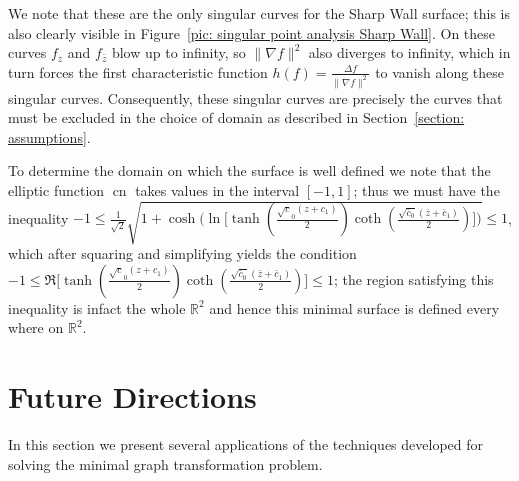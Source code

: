 \documentclass[12pt]{article}
\theoremstyle{plain}
\theoremstyle{definition}
\theoremstyle{remark}
\begin{document}
  We note that these are the only singular curves for the Sharp Wall surface; this is also clearly visible in Figure~\ref{pic: singular point analysis Sharp Wall}. On these curves \(f_z\) and \(f_{\bar z}\) blow up to infinity, so \(\|\nabla f\|^2\) also diverges to infinity, which in turn forces the first characteristic function \(h(f)=\tfrac{\Delta f}{\|\nabla f\|^2}\) to vanish along these singular curves. Consequently, these singular curves are precisely the curves that must be excluded in the choice of domain as described in Section~\ref{section: assumptions}.
  
  To determine the domain on which the surface is well defined we note that the elliptic function \(\operatorname{cn}\) takes values in the interval \([-1,1]\); thus we must have the inequality \(-1\leq\tfrac{1}{\sqrt{2}}\sqrt{1 + \cosh\!\big(\ln\!\big[\tanh(\tfrac{\sqrt c_0(z+c_1)}{2})\coth(\tfrac{\sqrt{\bar c_0}(\bar z+\bar c_1)}{2})\big]\big)}\leq 1\), which after squaring and simplifying yields the condition \(-1\leq\Re\!\big[\tanh(\tfrac{\sqrt c_0(z+c_1)}{2})\coth(\tfrac{\sqrt{\bar c_0}(\bar z+\bar c_1)}{2})\big]\leq 1\); the region satisfying this inequality is infact the whole \(\mathbb{R}^2\) and hence this minimal surface is defined every where on \(\mathbb{R}^2\).
  
  \section{Future Directions}
  In this section we present several applications of the techniques developed for solving the minimal graph transformation problem.
  
\end{document}
